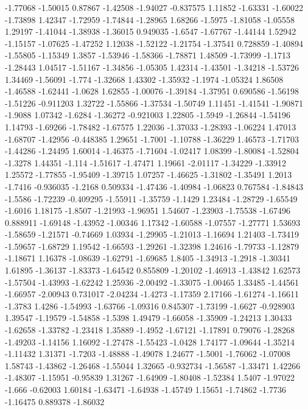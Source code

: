 \documentclass[9pt]{article}
\theoremstyle{plain}
\theoremstyle{definition}
\theoremstyle{remark}
\numberwithin{equation}{section}
\begin{document}
-1.77068
-1.50015
0.87867
-1.42508
-1.94027
-0.837575
1.11852
-1.63331
-1.60022
-1.73898
1.42347
-1.72959
-1.74844
-1.28965
1.68266
-1.5975
-1.81058
-1.05558
1.29197
-1.41044
-1.38938
-1.36015
0.949035
-1.6547
-1.67767
-1.44144
1.52942
-1.15157
-1.07625
-1.47252
1.12038
-1.52122
-1.21754
-1.37541
0.728859
-1.40894
-1.55805
-1.15349
1.3857
-1.53946
-1.58366
-1.78871
1.48509
-1.73999
-1.1713
-1.28443
1.04517
-1.51167
-1.34856
-1.05305
1.42314
-1.43501
-1.34218
-1.53726
1.34469
-1.56091
-1.774
-1.32668
1.43302
-1.35932
-1.1974
-1.05324
1.86508
-1.46588
-1.62441
-1.0628
1.62855
-1.00076
-1.39184
-1.37951
0.690586
-1.56198
-1.51226
-0.911203
1.32722
-1.55866
-1.37534
-1.50749
1.11451
-1.41541
-1.90871
-1.9088
1.07342
-1.6284
-1.36272
-0.921003
1.22805
-1.5949
-1.26844
-1.54196
1.14793
-1.69266
-1.78482
-1.67575
1.22036
-1.37033
-1.28393
-1.06224
1.47013
-1.68707
-1.42956
-0.448385
1.29651
-1.7001
-1.10788
-1.36229
1.46573
-1.71703
-1.44286
-1.24495
1.60014
-1.46375
-1.71604
-1.02417
1.08399
-1.80084
-1.52804
-1.3278
1.44351
-1.114
-1.51617
-1.47471
1.19661
-2.01117
-1.34229
-1.33912
1.25572
-1.77855
-1.95409
-1.39715
1.07257
-1.46625
-1.31802
-1.35491
1.2013
-1.7416
-0.936035
-1.2168
0.509334
-1.47436
-1.40984
-1.06823
0.767584
-1.84843
-1.5586
-1.72239
-0.409295
-1.55911
-1.35759
-1.1429
1.23484
-1.28729
-1.65549
-1.6016
1.18175
-1.8507
-1.21993
-1.96951
1.54607
-1.23903
-1.75538
-1.67496
0.888911
-1.69148
-1.43952
-1.00346
1.17342
-1.60588
-1.07557
-1.27771
1.53693
-1.58659
-1.21571
-0.74669
1.03934
-1.29905
-1.21013
-1.16694
1.21403
-1.73419
-1.59657
-1.68729
1.19542
-1.66593
-1.29261
-1.32398
1.24616
-1.79733
-1.12879
-1.18671
1.16378
-1.08639
-1.62791
-1.69685
1.8405
-1.34913
-1.2918
-1.30341
1.61895
-1.36137
-1.83373
-1.64542
0.855809
-1.20102
-1.46913
-1.43842
1.62573
-1.57504
-1.43993
-1.62242
1.25936
-2.00492
-1.33075
-1.00465
1.33485
-1.44561
-1.66957
-2.00943
0.731017
-2.04234
-1.4273
-1.17359
2.17166
-1.61274
-1.16611
-1.3783
1.4286
-1.54993
-1.63766
-1.09316
0.845307
-1.73199
-1.6627
-0.928903
1.39547
-1.19579
-1.54858
-1.5398
1.49479
-1.66058
-1.35909
-1.24213
1.30433
-1.62658
-1.33782
-1.23418
1.35889
-1.4952
-1.67121
-1.17891
0.79076
-1.28268
-1.49203
-1.14156
1.16092
-1.27478
-1.55423
-1.0428
1.74177
-1.09644
-1.35214
-1.11432
1.31371
-1.7203
-1.48888
-1.49078
1.24677
-1.5001
-1.76062
-1.07008
1.58743
-1.43862
-1.26468
-1.55044
1.32665
-0.932734
-1.56587
-1.33471
1.42266
-1.48307
-1.15951
-0.95839
1.31267
-1.64909
-1.80408
-1.52384
1.5407
-1.97022
-1.666
-0.62003
1.60184
-1.63471
-1.64938
-1.45749
1.15651
-1.74862
-1.7736
-1.16475
0.889378
-1.86032
\end{document}
